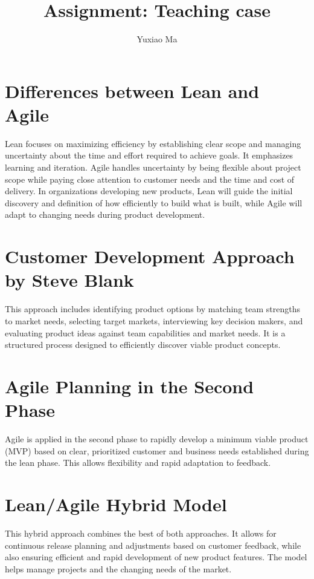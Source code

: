 \documentclass[UTF8,a4paper,AutoFakeBold,AutoFakeSlant]{article}
\title{\textbf{\textsf{{\textsf{Assignment: Teaching case}}}}}
\author{\tnewroman Yuxiao Ma}
\date{}
\begin{document}
\maketitle


\section{Differences between Lean and Agile}

Lean focuses on maximizing efficiency by establishing clear scope and managing uncertainty about the time and effort required to achieve goals. It emphasizes learning and iteration. Agile handles uncertainty by being flexible about project scope while paying close attention to customer needs and the time and cost of delivery. In organizations developing new products, Lean will guide the initial discovery and definition of how efficiently to build what is built, while Agile will adapt to changing needs during product development.


\section{Customer Development Approach by Steve Blank}

This approach includes identifying product options by matching team strengths to market needs, selecting target markets, interviewing key decision makers, and evaluating product ideas against team capabilities and market needs. It is a structured process designed to efficiently discover viable product concepts.


\section{Agile Planning in the Second Phase}

Agile is applied in the second phase to rapidly develop a minimum viable product (MVP) based on clear, prioritized customer and business needs established during the lean phase. This allows flexibility and rapid adaptation to feedback.

\section{Lean/Agile Hybrid Model}

This hybrid approach combines the best of both approaches. It allows for continuous release planning and adjustments based on customer feedback, while also ensuring efficient and rapid development of new product features. The model helps manage projects and the changing needs of the market.
\end{document}
